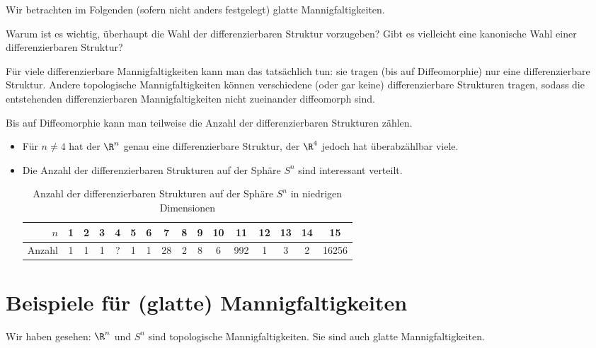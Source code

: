 \begin{conv*}
    Wir betrachten im Folgenden (sofern nicht anders festgelegt) glatte Mannigfaltigkeiten.
\end{conv*}

Warum ist es wichtig, überhaupt die Wahl der differenzierbaren Struktur vorzugeben?
Gibt es vielleicht eine kanonische Wahl einer differenzierbaren Struktur?

Für viele differenzierbare Mannigfaltigkeiten kann man das tatsächlich tun:
sie tragen (bis auf Diffeomorphie) nur eine differenzierbare Struktur.
Andere topologische Mannigfaltigkeiten können verschiedene (oder gar keine) differenzierbare Strukturen tragen, sodass die entstehenden differenzierbaren Mannigfaltigkeiten nicht zueinander diffeomorph sind.

\begin{ex*}
    Bis auf Diffeomorphie kann man teilweise die Anzahl der differenzierbaren Strukturen zählen.
    \begin{itemize}
        \item
            Für $n \neq 4$ hat der $\R^n$ genau eine differenzierbare Struktur,
            der $\R^4$ jedoch hat überabzählbar viele.
        \item
            Die Anzahl der differenzierbaren Strukturen auf der Sphäre $S^n$ sind interessant verteilt.
            \begin{table}[ht]
                \begin{tabular}{r|ccccccccccccccc}
                    $n$ & 1 & 2 & 3 & 4 & 5 & 6 & 7 & 8 & 9 & 10 & 11 & 12 & 13 & 14 & 15 \\ \hline
                    Anzahl & 1 & 1 & 1 & ? & 1 & 1 & 28 & 2 & 8 & 6 & 992 & 1 & 3 & 2 & 16256
                \end{tabular}
                \caption{Anzahl der differenzierbaren Strukturen auf der Sphäre $S^n$ in niedrigen Dimensionen}
            \end{table}
    \end{itemize}
\end{ex*}


\section{Beispiele für (glatte) Mannigfaltigkeiten}


Wir haben gesehen: $\R^n$ und $S^n$ sind topologische Mannigfaltigkeiten.
Sie sind auch glatte Mannigfaltigkeiten.

